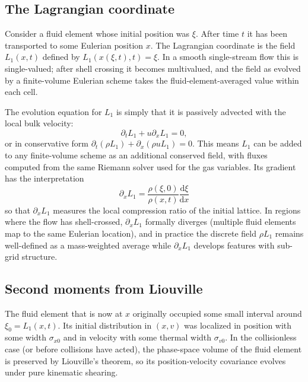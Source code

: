 \documentclass[11pt,letterpaper]{article}
\newcommand{\diff}{\mathrm{d}}
\begin{document}
\subsection{The Lagrangian coordinate}

Consider a fluid element whose initial position was $\xi$. After time $t$ it has been transported to some Eulerian position $x$. The Lagrangian coordinate is the field $L_1(x, t)$ defined by $L_1(x(\xi, t), t) = \xi$. In a smooth single-stream flow this is single-valued; after shell crossing it becomes multivalued, and the field as evolved by a finite-volume Eulerian scheme takes the fluid-element-averaged value within each cell.

The evolution equation for $L_1$ is simply that it is passively advected with the local bulk velocity:
\begin{equation}
\partial_t L_1 + u \partial_x L_1 = 0,
\end{equation}
or in conservative form $\partial_t(\rho L_1) + \partial_x(\rho u L_1) = 0$. This means $L_1$ can be added to any finite-volume scheme as an additional conserved field, with fluxes computed from the same Riemann solver used for the gas variables. Its gradient has the interpretation
\begin{equation}
\partial_x L_1 = \frac{\rho(\xi, 0)}{\rho(x, t)} \frac{\diff \xi}{\diff x}
\end{equation}
so that $\partial_x L_1$ measures the local compression ratio of the initial lattice. In regions where the flow has shell-crossed, $\partial_x L_1$ formally diverges (multiple fluid elements map to the same Eulerian location), and in practice the discrete field $\rho L_1$ remains well-defined as a mass-weighted average while $\partial_x L_1$ develops features with sub-grid structure.

\subsection{Second moments from Liouville}

The fluid element that is now at $x$ originally occupied some small interval around $\xi_0 = L_1(x, t)$. Its initial distribution in $(x, v)$ was localized in position with some width $\sigma_{x0}$ and in velocity with some thermal width $\sigma_{v0}$. In the collisionless case (or before collisions have acted), the phase-space volume of the fluid element is preserved by Liouville's theorem, so its position-velocity covariance evolves under pure kinematic shearing.
\end{document}
